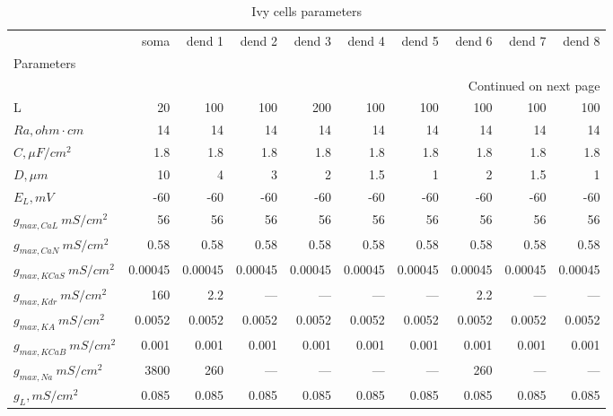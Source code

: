 \begin{longtable}{lrrrrrrrrr}
\caption{Ivy cells parameters}\label{ca1_ivy_cell_parameters}\\
\toprule
{} &    soma &  dend 1 &  dend 2 &  dend 3 &  dend 4 &  dend 5 &  dend 6 &  dend 7 &  dend 8 \\
Parameters         &         &         &         &         &         &         &         &         &         \\
\midrule
\endhead
\midrule
\multicolumn{10}{r}{{Continued on next page}} \\
\midrule
\endfoot

\bottomrule
\endlastfoot
L                  &      20 &     100 &     100 &     200 &     100 &     100 &     100 &     100 &     100 \\
$Ra,
 ohm \cdot cm$                 &      14 &      14 &      14 &      14 &      14 &      14 &      14 &      14 &      14 \\
$C, \mu F / cm^2$                 &     1.8 &     1.8 &     1.8 &     1.8 &     1.8 &     1.8 &     1.8 &     1.8 &     1.8 \\
$D, \mu m$               &      10 &       4 &       3 &       2 &     1.5 &       1 &       2 &     1.5 &       1 \\
$E_L,  mV$          &     -60 &     -60 &     -60 &     -60 &     -60 &     -60 &     -60 &     -60 &     -60 \\
$g_{max, CaL       }\  mS / cm^2$&      56 &      56 &      56 &      56 &      56 &      56 &      56 &      56 &      56 \\
$g_{max, CaN       }\  mS / cm^2$&    0.58 &    0.58 &    0.58 &    0.58 &    0.58 &    0.58 &    0.58 &    0.58 &    0.58 \\
$g_{max, KCaS       }\  mS / cm^2$& 0.00045 & 0.00045 & 0.00045 & 0.00045 & 0.00045 & 0.00045 & 0.00045 & 0.00045 & 0.00045 \\
$g_{max, Kdr }\  mS / cm^2$&     160 &     2.2 &    ---  &    ---  &    ---  &    ---  &     2.2 &    ---  &    ---  \\
$g_{max, KA     }\  mS / cm^2$&  0.0052 &  0.0052 &  0.0052 &  0.0052 &  0.0052 &  0.0052 &  0.0052 &  0.0052 &  0.0052 \\
$g_{max, KCaB      }\  mS / cm^2$&   0.001 &   0.001 &   0.001 &   0.001 &   0.001 &   0.001 &   0.001 &   0.001 &   0.001 \\
$g_{max, Na     }\  mS / cm^2$&    3800 &     260 &    ---  &    ---  &    ---  &    ---  &     260 &    ---  &    ---  \\
$g_L,  mS / cm^2$       &   0.085 &   0.085 &   0.085 &   0.085 &   0.085 &   0.085 &   0.085 &   0.085 &   0.085 \\
\end{longtable}
